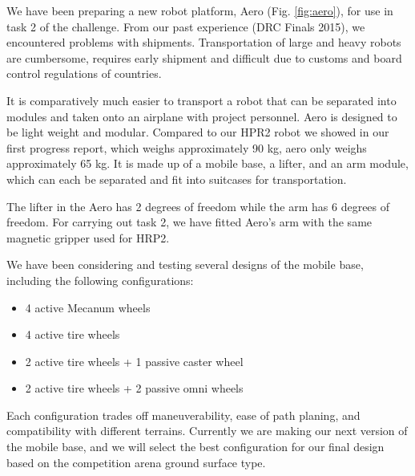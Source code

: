 \documentclass{standalone}
\begin{document}
We have been preparing a new robot platform, Aero (Fig.
\ref{fig:aero}), for use in task 2 of the challenge. From our past
experience (DRC Finals 2015), we encountered problems
with shipments. Transportation of large and heavy robots are
cumbersome, requires early shipment and difficult due to customs and
board control regulations of countries. 




It is comparatively much easier to transport a robot that
can be separated into modules and taken onto an airplane with project personnel.
Aero is designed to be light weight and modular. Compared to 
our HPR2 robot we showed in our first progress report, which weighs
approximately 90 kg, aero only weighs approximately 65 kg. It is 
made up of a mobile base, a lifter, and an arm module, which can each 
be separated and fit into suitcases for transportation. 


The lifter in the Aero has 2 degrees of freedom while the arm has 6 degrees
of freedom. For carrying out task 2, we have fitted Aero's arm
with the same magnetic gripper used for HRP2. 




We have been considering and testing several designs of the mobile base, including the following configurations:
\begin{itemize}
	\item 4 active Mecanum wheels 
	\item 4 active tire wheels
	\item 2 	active tire wheels + 1 passive caster wheel
	\item 2 	active tire wheels + 2 passive omni wheels
\end{itemize}

Each configuration trades off maneuverability, ease of path planing,
and compatibility with different terrains. Currently we are making our
next version of the mobile base, and we will select the best
configuration for our final design based on the competition arena
ground surface type. 
\end{document}
